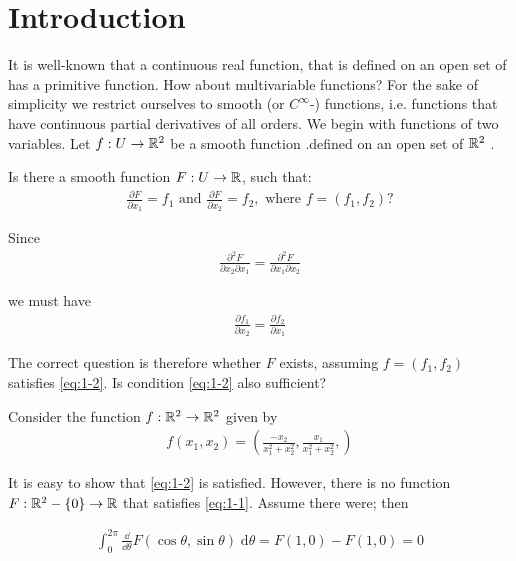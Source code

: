 \chapter{Introduction}
It is well-known that a continuous real function, that is defined on an open set of
\RR has a primitive function. How about multivariable functions? For the sake of
simplicity we restrict ourselves to smooth (or $C^\infty$-) functions, i.e. functions that
have continuous partial derivatives of all orders.
We begin with functions of two variables. Let $f:U\to \mathbb{R}^2$ be a smooth function
.defined on an open set of $\mathbb{R}^2$ .

\begin{question}\label{question:1-1}
Is there a smooth function $F:U\to \mathbb{R}$, such that:
\begin{align}
  \frac{\partial F }{\partial x_1 } = f_1 \text{ and }
  \frac{\partial F }{\partial x_2 } = f_2, \text{ where } 
  f = (f_1, f_2)?
  \label{eq:1-1}
\end{align}

Since
\begin{align*}
  \frac{\partial ^2 F }{\partial x_2\partial x_1 } = 
  \frac{\partial ^2 F }{\partial x_1\partial x_2 }
\end{align*}

we must have 
\begin{align}
  \frac{\partial f_1 }{\partial x_2 } = \frac{\partial f_2 }{\partial x_1}
  \label{eq:1-2}
\end{align}

The correct question is therefore whether $F$ exists, assuming $f = (f_1, f_2)$ satisfies
\eqref{eq:1-2}. Is condition \eqref{eq:1-2} also sufficient?
\end{question}


\begin{example}\label{example:1-2}
Consider the function $f:\mathbb{R}^2 \to \mathbb{R}^2$ given by
\begin{align*}
  f(x_1, x_2) = \left(\frac{-x_2}{x_1^2 +x_2^2}, \frac{x_1}{x_1^2 +x_2^2},\right)
\end{align*}
\end{example}

It is easy to show that \eqref{eq:1-2} is satisfied. However, there is no function $F:\mathbb{R}^2-\{0\}\to \mathbb{R}$
that satisfies \eqref{eq:1-1}. Assume there were; then

\begin{align*}
  \int_{0}^{2\pi}{\frac{\dd }{\dd\theta} F(\cos\theta, \sin\theta)\;\mathrm{d}\theta}
  = F(1, 0) - F(1, 0) = 0
\end{align*}

